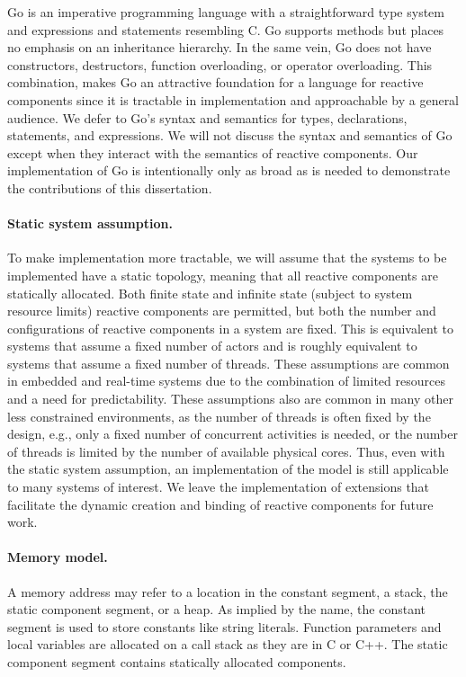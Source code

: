 Go is an imperative programming language with a straightforward type system and expressions and statements resembling C.
Go supports methods but places no emphasis on an inheritance hierarchy.
In the same vein, Go does not have constructors, destructors, function overloading, or operator overloading.
This combination, makes Go an attractive foundation for a language for reactive components since it is tractable in implementation and approachable by a general audience.
We defer to Go's syntax and semantics for types, declarations, statements, and expressions.
We will not discuss the syntax and semantics of Go except when they interact with the semantics of reactive components.
Our implementation of Go is intentionally only as broad as is needed to demonstrate the contributions of this dissertation.

\paragraph{Static system assumption.}
To make implementation more tractable, we will assume that the systems to be implemented have a static topology, meaning that all reactive components are statically allocated.
Both finite state and infinite state (subject to system resource limits) reactive components are permitted, but both the number and configurations of reactive components in a system are fixed.
This is equivalent to systems that assume a fixed number of actors and is roughly equivalent to systems that assume a fixed number of threads.
These assumptions are common in embedded and real-time systems due to the combination of limited resources and a need for predictability.
These assumptions also are common in many other less constrained environments, as the number of threads is often fixed by the design, e.g., only a fixed number of concurrent activities is needed, or the number of threads is limited by the number of available physical cores.
Thus, even with the static system assumption, an implementation of the model is still applicable to many systems of interest.
We leave the implementation of extensions that facilitate the dynamic creation and binding of reactive components for future work.

\paragraph{Memory model.}
A memory address may refer to a location in the constant segment, a stack, the static component segment, or a heap.
As implied by the name, the constant segment is used to store constants like string literals.
Function parameters and local variables are allocated on a call stack as they are in C or C++.
The static component segment contains statically allocated components.

